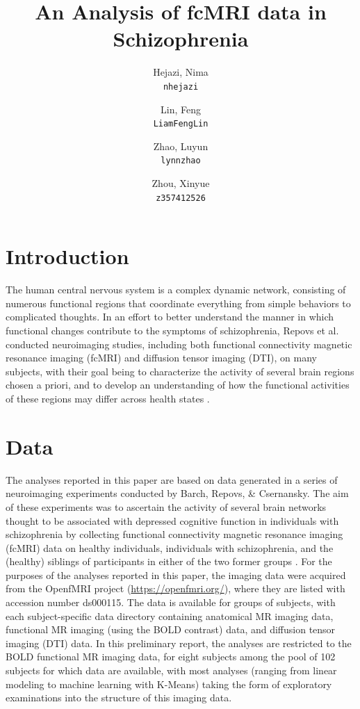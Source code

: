 \documentclass[11pt]{article}
\title{An Analysis of fcMRI data in Schizophrenia}
\author{
  Hejazi, Nima\\
  \texttt{nhejazi}
  \and
  Lin, Feng\\
  \texttt{LiamFengLin}
  \and
  Zhao, Luyun\\
  \texttt{lynnzhao}
  \and
  Zhou, Xinyue\\
  \texttt{z357412526}
}
\begin{document}
\maketitle


\section{Introduction}

The human central nervous system is a complex dynamic network, consisting of
numerous functional regions that coordinate everything from simple behaviors to
complicated thoughts. In an effort to better understand the manner in which
functional changes contribute to the symptoms of schizophrenia, Repovs et
al. conducted neuroimaging studies, including both functional connectivity
magnetic resonance imaging (fcMRI) and diffusion tensor imaging (DTI), on many
subjects, with their goal being to characterize the activity of several brain
regions chosen a priori, and to develop an understanding of how the functional 
activities of these regions may differ across health states \cite{repovs2011,repovs2012}.

\section{Data}

The analyses reported in this paper are based on data generated in a series of
neuroimaging experiments conducted by Barch, Repovs, \& Csernansky. The aim of
these experiments was to ascertain the activity of several brain networks
thought to be associated with depressed cognitive function in individuals with
schizophrenia by collecting functional connectivity magnetic resonance imaging
(fcMRI) data on healthy individuals, individuals with schizophrenia, and the
(healthy) siblings of participants in either of the two former groups
\cite{repovs2012}. For the purposes of the analyses reported in this paper, the imaging
data were acquired from the OpenfMRI project (\url{https://openfmri.org/}), where they
are listed with accession number ds000115. The data is available for groups of
subjects, with each subject-specific data directory containing anatomical MR
imaging data, functional MR imaging (using the BOLD contrast) data, and
diffusion tensor imaging (DTI) data. In this preliminary report, the analyses
are restricted to the BOLD functional MR imaging data, for eight subjects among
the pool of 102 subjects for which data are available, with most analyses
(ranging from linear modeling to machine learning with K-Means) taking the form
of exploratory examinations into the structure of this imaging data.
\end{document}
